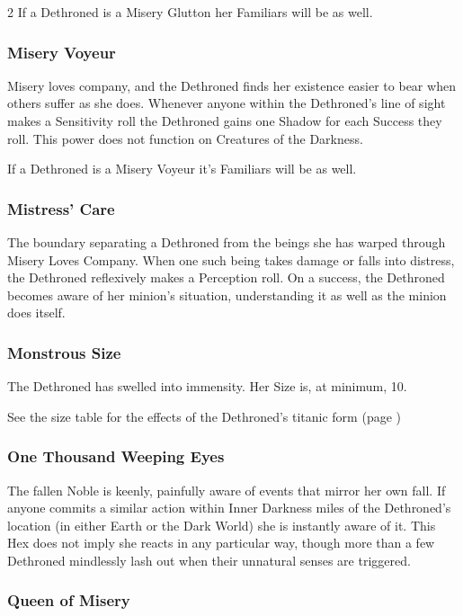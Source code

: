 \begin{multicols}{2}
If a Dethroned is a Misery Glutton her Familiars will be as well.

\subsubsection*{Misery Voyeur}

Misery loves company, and the Dethroned finds her existence easier to bear when others suffer as she does. Whenever anyone within the Dethroned's line of sight makes a Sensitivity roll the Dethroned gains one Shadow for each Success they roll. This power does not function on Creatures of the Darkness.

If a Dethroned is a Misery Voyeur it's Familiars will be as well. 

\subsubsection*{Mistress’ Care}

The boundary separating a Dethroned from the beings she has warped through Misery Loves Company. When one such being takes damage or falls into distress, the Dethroned reflexively makes a Perception roll. On a success, the Dethroned becomes aware of her minion’s situation, understanding it as well as the minion does itself.

\subsubsection*{Monstrous Size}

The Dethroned has swelled into immensity. Her Size is, at minimum, 10.

See the size table for the effects of the Dethroned's titanic form (page \pageref{SizeTable})

\subsubsection*{One Thousand Weeping Eyes}

The fallen Noble is keenly, painfully aware of events that mirror her own fall. If anyone commits a similar action within Inner Darkness miles of the Dethroned's location (in either Earth or the Dark World) she is instantly aware of it. This Hex does not imply she reacts in any particular way, though more than a few Dethroned mindlessly lash out when their unnatural senses are triggered.

\subsubsection*{Queen of Misery}


\end{multicols}
